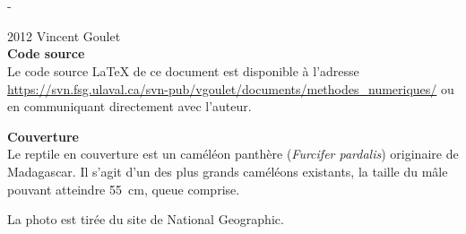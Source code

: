 

\cleardoublepage

\begin{adjustwidth*}{13.1mm}{-72mm}
  \sffamily
  \raggedright
  \vspace*{5mm}
  \thetitle \\
  \vspace*{3cm}
  \theauthor \\
  \vspace*{\fill}
  \thedate
\end{adjustwidth*}
\clearpage

\begingroup
\calccentering{\unitlength}
\begin{adjustwidth*}{\unitlength}{-\unitlength}
  \small
  \setlength{\parindent}{0pt}
  \setlength{\parskip}{\baselineskip}

  {\textcopyright} 2012 Vincent Goulet \\

  

  \textbf{Code source} \\
  Le code source {\LaTeX} de ce document est disponible à l'adresse
    \url{https://svn.fsg.ulaval.ca/svn-pub/vgoulet/documents/methodes_numeriques/}
  ou en communiquant directement avec l'auteur.

  \textbf{Couverture} \\
  Le reptile en couverture est un caméléon panthère (\emph{Furcifer
    pardalis}) originaire de Madagascar. Il s'agit d'un des plus
  grands caméléons existants, la taille du mâle pouvant atteindre
  55~cm, queue comprise.

  La photo est tirée du site de National Geographic.
\end{adjustwidth*}
\endgroup

\clearpage

